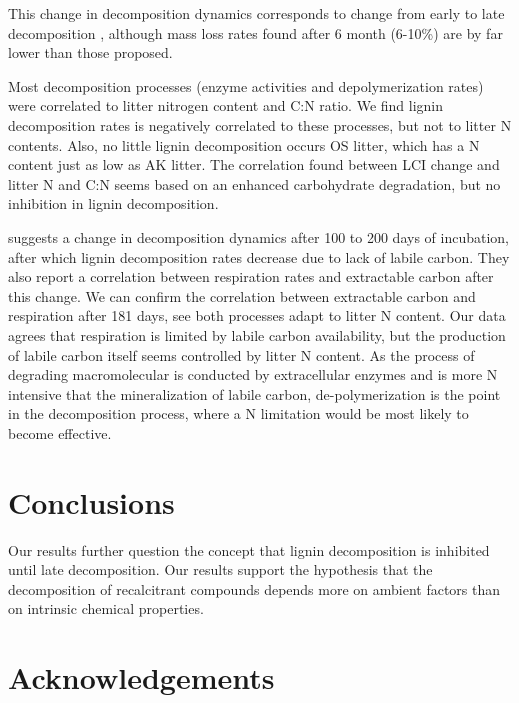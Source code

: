 \documentclass[authoryear,preprint,review,12pt]{elsarticle}
\begin{document}
This change in decomposition dynamics corresponds to change from early to late decomposition \citep{Berg2008}, although mass loss rates found after 6 month (6-10\%) are by far lower than those proposed.

Most decomposition processes (enzyme activities and depolymerization rates) were correlated to litter nitrogen content and C:N ratio. We find lignin decomposition rates is negatively correlated to these processes, but not to litter N contents. Also, no little lignin decomposition occurs OS litter, which has a N content just as low as AK litter. The correlation found between LCI change and litter N and C:N seems based on an enhanced carbohydrate degradation, but no inhibition in lignin decomposition.

\cite{Klotzbucher2011} suggests a change in decomposition dynamics after 100 to 200 days of incubation, after which lignin decomposition rates decrease due to lack of labile carbon. They also report a correlation between respiration rates and extractable carbon after this change. We can confirm the correlation between extractable carbon and respiration after 181 days, see both processes adapt to litter N content. Our data agrees that respiration is limited by labile carbon availability, but the production of labile carbon itself seems controlled by litter N content. As the process of degrading macromolecular is conducted by extracellular enzymes and is more N intensive that the mineralization of labile carbon, de-polymerization is the point in the decomposition process, where a N limitation would be most likely to become effective.

\section{Conclusions}

Our results further question the concept that lignin decomposition is inhibited until late decomposition. Our results support the hypothesis that the decomposition of recalcitrant compounds depends more on ambient factors than on intrinsic chemical properties.


\section{Acknowledgements}



\end{document}
